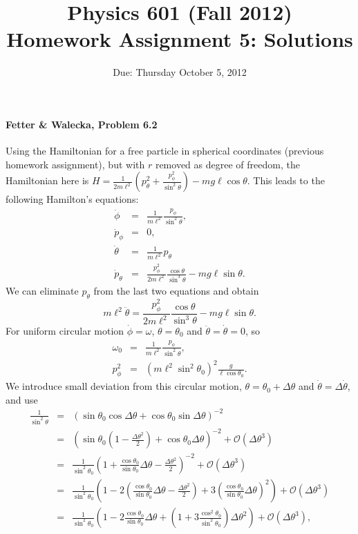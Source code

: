 \documentclass[letterpaper,11pt]{article}
\title{Physics 601 (Fall 2012) \\ Homework Assignment 5: Solutions}
\date{Due: Thursday October 5, 2012}
\begin{document}
\maketitle

\paragraph{Fetter \& Walecka, Problem 6.2}
Using the Hamiltonian for a free particle in spherical coordinates (previous homework assignment), but with $r$ removed as degree of freedom, the Hamiltonian here is $H = \frac{1}{2 m \ell^2} \left( p_\theta^2 + \frac{p_\phi^2}{\sin^2\theta} \right) - m g \ell \cos\theta$.  This leads to the following Hamilton's equations:
\begin{eqnarray*}
 \dot{\phi} & =  & \frac{1}{m\ell^2} \frac{p_\phi}{\sin^2\theta}, \\
 \dot{p}_\phi & = & 0, \\
 \dot{\theta} & = & \frac{1}{m\ell^2} p_\theta \\
 \dot{p}_\theta & = & \frac{p_\phi^2}{2m\ell^2} \frac{\cos\theta}{\sin^3\theta} - mg\ell\sin\theta.
\end{eqnarray*}
We can eliminate $p_\theta$ from the last two equations and obtain
\begin{equation*}
 m\ell^2\ddot{\theta} = \frac{p_\phi^2}{2m\ell^2} \frac{\cos\theta}{\sin^3\theta} - mg\ell\sin\theta.
\end{equation*}
For uniform circular motion $\dot\phi = \omega$, $\theta = \theta_0$ and $\ddot\theta = \dot\theta = 0$, so
\begin{eqnarray*}
 \omega_0 & = & \frac{1}{m\ell^2} \frac{p_\phi}{\sin^2\theta}, \\
 p_\phi^2 & = & \left(m\ell^2\sin^2\theta_0\right)^2 \frac{g}{\ell\cos\theta_0}.
\end{eqnarray*}
We introduce small deviation from this circular motion, $\theta = \theta_0 + \Delta\theta$ and $\dot\theta = \Delta\dot\theta$, and use
\begin{eqnarray*}
 \frac{1}{\sin^2\theta} & = & \left( \sin\theta_0 \cos\Delta\theta + \cos\theta_0 \sin\Delta\theta \right)^{-2} \\
 & = & \left( \sin\theta_0 \left(1 - \frac{\Delta\theta^2}{2}\right) + \cos\theta_0 \Delta\theta \right)^{-2} + \mathcal{O}(\Delta\theta^3) \\
 & = & \frac{1}{\sin^2\theta_0} \left( 1 + \frac{\cos\theta_0}{\sin\theta_0} \Delta\theta - \frac{\Delta\theta^2}{2} \right)^{-2}  + \mathcal{O}(\Delta\theta^3) \\
 & = & \frac{1}{\sin^2\theta_0} \left( 1 - 2 \left( \frac{\cos\theta_0}{\sin\theta_0} \Delta\theta - \frac{\Delta\theta^2}{2} \right) + 3 \left( \frac{\cos\theta_0}{\sin\theta_0} \Delta\theta \right)^2 \right) + \mathcal{O}(\Delta\theta^3) \\
 & = & \frac{1}{\sin^2\theta_0} \left( 1 - 2 \frac{\cos\theta_0}{\sin\theta_0} \Delta\theta + \left(1 + 3 \frac{\cos^2\theta_0}{\sin^2\theta_0} \right) \Delta\theta^2 \right) + \mathcal{O}(\Delta\theta^3),
\end{eqnarray*}
\end{document}
